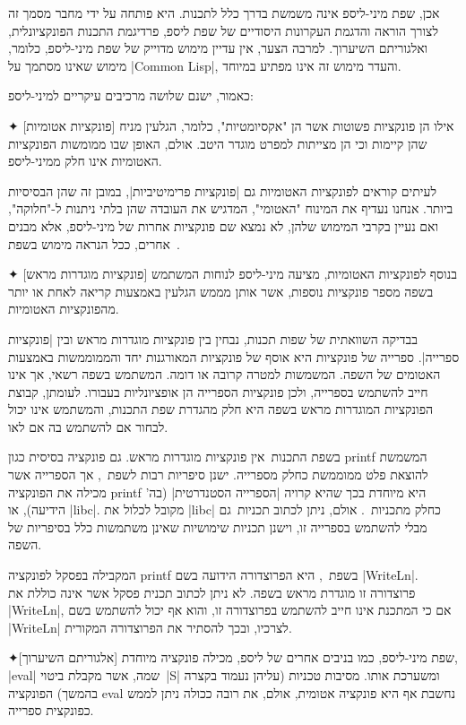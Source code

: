 אכן, שפת מיני-ליספ אינה משמשת בדרך כלל לתכנות. היא פותחה על ידי מחבר מסמך זה
לצורך הוראה והדגמת העקרונות היסודיים של שפת ליספ, פרדיגמת התכנות הפונקציונלית,
ואלגוריתם השיערוך. למרבה הצער, אין עדיין מימוש מדוייק של שפת מיני-ליספ, כלומר,
מימוש שאינו מסתמך על \E|Common Lisp|, והעדר מימוש זה אינו מפתיע במיוחד.

כאמור, ישנם שלושה מרכיבים עיקריים למיני-ליספ:
\begin{description}
  ✦ [פונקציות אטומיות] אילו הן פונקציות פשוטות אשר הן "אקסיומטיות", כלומר,
  הגלעין מניח שהן קיימות וכי הן מצייתות למפרט מוגדר היטב. אולם, האופן שבו
  ממומשות הפונקציות האטומיות אינו חלק ממיני-ליספ.

  לעיתים קוראים לפונקציות האטומיות גם \ע|פונקציות פרימיטיביות|, במובן זה שהן
  הבסיסיות ביותר. אנחנו נעדיף את המינוח "האטומי", המדגיש את העובדה שהן בלתי
  ניתנות ל-"חלוקה", ואם נעיין בקרבי המימוש שלהן, לא נמצא שם פונקציות אחרות של
  מיני-ליספ, אלא מבנים אחרים, ככל הנראה מימוש בשפת~\CPL.

  ✦ [פונקציות מוגדרות מראש] בנוסף לפונקציות האטומיות, מציעה מיני-ליספ לנוחות
  המשתמש בשפה מספר פונקציות נוספות, אשר אותן מממש הגלעין באמצעות קריאה
  לאחת או יותר מהפונקציות האטומיות.

  בבדיקה השוואתית של שפות תכנות, נבחין בין פונקציות מוגדרות מראש ובין
  \ע|פונקציות ספרייה|. ספרייה של פונקציות היא אוסף של פונקציות המאורגנות יחד
  והממוממשות באמצעות האטומים של השפה. המשמשות למטרה קרובה או דומה. המשתמש
  בשפה רשאי, אך אינו חייב להשתמש בספרייה, ולכן פונקציות הספרייה הן אופציונליות
  בעבורו. לעומתן, קבוצת הפונקציות המוגדרות מראש בשפה היא חלק מהגדרת שפת התכנות,
  והמשתמש אינו יכול לבחור אם להשתמש בה אם לאו.

  בשפת התכנות~\CPL אין פונקציות מוגדרות מראש. גם פונקציה בסיסית כגון printf
  המשמשת להוצאת פלט ממוממשת כחלק מספרייה. ישנן סיפריות רבות לשפת~\CPL, אך
  הספרייה אשר מכילה את הפונקציה printf היא מיוחדת בכך שהיא קרויה \ע|הספרייה
  הסטנדרטית| (בה' הידיעה), או \E|libc|. מקובל לכלול את \E|libc| כחלק
  מתכניות~\CPL. אולם, ניתן לכתוב תכניות~\CPL גם מבלי להשתמש בספרייה זו, וישנן
  תכניות שימושיות שאינן משתמשות כלל בסיפריות של השפה.

  המקבילה בפסקל לפונקציה printf בשפת~\CPL, היא הפרוצדורה הידועה בשם
  \E|WriteLn|. פרוצדורה זו מוגדרת מראש בשפה. לא ניתן לכתוב תכנית פסקל אשר אינה
  כוללת את \E|WriteLn|, אם כי המתכנת אינו חייב להשתמש בפרוצדורה זו, והוא אף
  יכול להשתמש בשם \E|WriteLn| לצרכיו, ובכך להסתיר את הפרוצדורה המקורית.

  ✦[אלגוריתם השיערוך] שפת מיני-ליספ, כמו בניבים אחרים של ליספ, מכילה פונקציה
  מיוחדת, \E|eval| שמה, אשר מקבלת ביטוי~\E|S| ומשערכת אותו. מסיבות טכניות
  (עליהן נעמוד בקצרה בהמשך) הפונקציה eval נחשבת אף היא פונקציה אטומית, אולם, את
  רובה ככולה ניתן לממש כפונקצית ספרייה.
\end{description}

